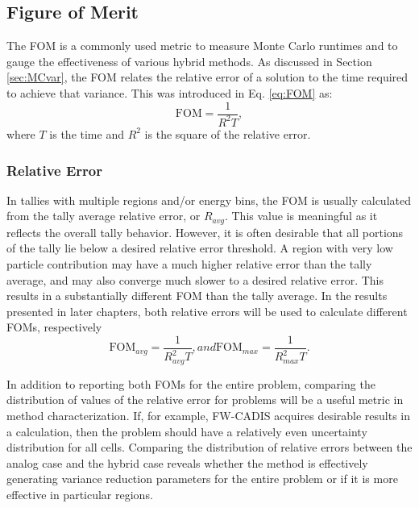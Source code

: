 \subsection{Figure of Merit}
\label{sec:FOMvariants}

The FOM is a commonly used metric to measure Monte Carlo
runtimes and to gauge the effectiveness of various hybrid methods. As discussed
in Section \ref{sec:MCvar}, the FOM relates the relative error of a solution to the
time required to achieve that variance. This was introduced in Eq.
\eqref{eq:FOM} as:
\begin{equation*}
  \text{FOM} = \frac{1}{R^{2}T} ,
\end{equation*}
where $T$ is the time and $R^{2}$ is the square of the relative error.

\subsubsection{Relative Error}

In tallies with multiple regions and/or energy bins, the FOM is usually calculated
from the tally average relative error, or $R_{avg}$. This value is meaningful as
it reflects the overall tally behavior. However, it is often desirable that all
portions of the tally lie below a desired relative error threshold. A region
with very low particle contribution may have a much higher relative error than
the tally average, and may also converge much slower to a desired relative
error. This results in a substantially different FOM than
the tally average. In the results presented in later chapters, both relative
errors will be used to calculate different FOMs, respectively
\begin{subequations}
  \begin{equation}
    \text{FOM}_{avg} = \frac{1}{R_{avg}^{2}T},
  \label{eq:FOMavg}
  \end{equation}
and
  \begin{equation}
    \text{FOM}_{max} = \frac{1}{R_{max}^{2}T} .
  \label{eq:FOMmax}
  \end{equation}
  \label{eq:FOMerror}
\end{subequations}

In addition to reporting both FOMs for the entire problem, comparing the
distribution of values of the relative error for problems will be a useful
metric in method characterization. If, for example, FW-CADIS acquires desirable
results in a calculation, then the problem should have a relatively even uncertainty
distribution for all cells. Comparing the distribution of relative errors
between the analog case and the hybrid case reveals whether the method is
effectively generating variance reduction parameters for the entire problem or
if it is more effective in particular regions.

